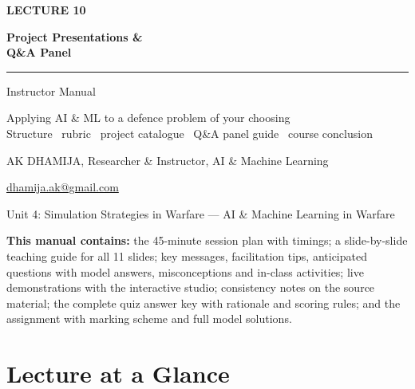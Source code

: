 \documentclass[11pt]{article}
\begin{document}
\begin{titlepage}\centering\vspace*{2.2cm}
{\color{AccN}\large\bfseries LECTURE 10\par}\vspace{0.6cm}
{\color{NavyN}\Huge\bfseries Project Presentations \&\\Q\&A Panel\par}\vspace{0.6cm}
{\color{AccN}\rule{0.7\textwidth}{1.5pt}}\par\vspace{0.6cm}
{\LARGE Instructor Manual\par}\vspace{0.4cm}
{\large\begin{minipage}{0.85\textwidth}\centering Applying AI \& ML to a defence problem of your choosing\\Structure \textbullet\ rubric \textbullet\ project catalogue \textbullet\ Q\&A panel guide \textbullet\ course conclusion\end{minipage}\par}\vspace{2cm}
{\large AK DHAMIJA, Researcher \& Instructor, AI \& Machine Learning\par}\vspace{0.2cm}
{\normalsize \href{mailto:dhamija.ak@gmail.com}{dhamija.ak@gmail.com} \quad\textbullet{}\par}\vspace{0.3cm}
{Unit 4: Simulation Strategies in Warfare --- AI \& Machine Learning in Warfare\par}\vfill
\begin{tcolorbox}[colback=NavyN!4,colframe=NavyN,boxrule=0.6pt,arc=2pt,width=0.9\textwidth]\small
\textbf{This manual contains:} the 45-minute session plan with timings; a slide-by-slide teaching guide for all 11 slides; key messages, facilitation tips, anticipated questions with model answers, misconceptions and in-class activities; live demonstrations with the interactive studio; consistency notes on the source material; the complete quiz answer key with rationale and scoring rules; and the assignment with marking scheme and full model solutions.
\end{tcolorbox}
\end{titlepage}
\tableofcontents\newpage


\section{Lecture at a Glance}
\end{document}

